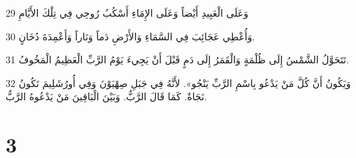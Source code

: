 \par 29 وَعَلَى الْعَبِيدِ أَيْضاً وَعَلَى الإِمَاءِ أَسْكُبُ رُوحِي فِي تِلْكَ الأَيَّامِ
\par 30 وَأُعْطِي عَجَائِبَ فِي السَّمَاءِ وَالأَرْضِ دَماً وَنَاراً وَأَعْمِدَةَ دُخَانٍ.
\par 31 تَتَحَوَّلُ الشَّمْسُ إِلَى ظُلْمَةٍ وَالْقَمَرُ إِلَى دَمٍ قَبْلَ أَنْ يَجِيءَ يَوْمُ الرَّبِّ الْعَظِيمُ الْمَخُوفُ.
\par 32 وَيَكُونُ أَنَّ كُلَّ مَنْ يَدْعُو بِاسْمِ الرَّبِّ يَنْجُو». لأَنَّهُ فِي جَبَلِ صِهْيَوْنَ وَفِي أُورُشَلِيمَ تَكُونُ نَجَاةٌ. كَمَا قَالَ الرَّبُّ. وَبَيْنَ الْبَاقِينَ مَنْ يَدْعُوهُ الرَّبُّ.

\chapter{3}

